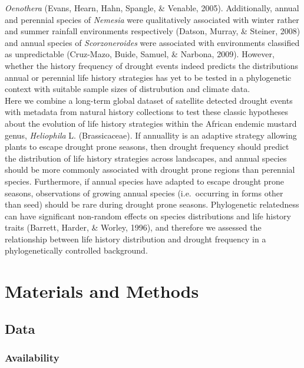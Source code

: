 \documentclass[man,floatsintext]{apa6}
\theoremstyle{definition}
\theoremstyle{definition}
\theoremstyle{definition}
\theoremstyle{remark}
\begin{document}
\emph{Oenothera} (Evans, Hearn, Hahn, Spangle, \& Venable, 2005).
Additionally, annual and perennial species of \emph{Nemesia} were
qualitatively associated with winter rather and summer rainfall
environments respectively (Datson, Murray, \& Steiner, 2008) and annual
species of \emph{Scorzoneroides} were associated with environments
classified as unpredictable (Cruz-Mazo, Buide, Samuel, \& Narbona,
2009). However, whether the history frequency of drought events indeed
predicts the distributions annual or perennial life history strategies
has yet to be tested in a phylogenetic context with suitable sample
sizes of distrubution and climate data.\\
Here we combine a long-term global dataset of satellite detected drought
events with metadata from natural history collections to test these
classic hypotheses about the evolution of life history strategies within
the African endemic mustard genus, \emph{Heliophila} L. (Brassicaceae).
If annuallity is an adaptive strategy allowing plants to escape drought
prone seasons, then drought frequency should predict the distribution of
life history strategies across landscapes, and annual species should be
more commonly associated with drought prone regions than perennial
species. Furthermore, if annual species have adapted to escape drought
prone seasons, observations of growing annual species (i.e.~occurring in
forms other than seed) should be rare during drought prone seasons.
Phylogenetic relatedness can have significant non-random effects on
species distributions and life history traits (Barrett, Harder, \&
Worley, 1996), and therefore we assessed the relationship between life
history distribution and drought frequency in a phylogenetically
controlled background.

\hypertarget{materials-and-methods}{%
\section{Materials and Methods}\label{materials-and-methods}}

\hypertarget{data}{%
\subsection{Data}\label{data}}

\hypertarget{availability}{%
\subsubsection{Availability}\label{availability}}
\end{document}
